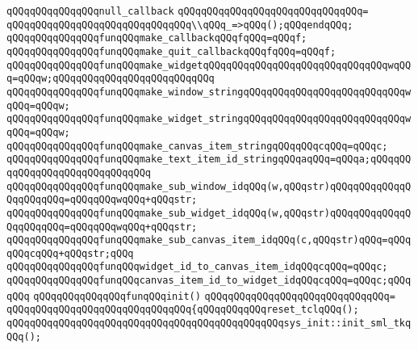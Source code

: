 \verb|qQQqqQQqqQQqqQQqnull_callback|\newline
\verb|qQQqqQQqqQQqqQQqqQQqqQQqqQQqqQQq=|\newline
\verb|qQQqqQQqqQQqqQQqqQQqqQQqqQQqqQQq\\qQQq_=>qQQq();qQQqendqQQq;|\newline
\newline
\verb|qQQqqQQqqQQqqQQqfunqQQqmake_callbackqQQqfqQQq=qQQqf;|\newline
\newline
\verb|qQQqqQQqqQQqqQQqfunqQQqmake_quit_callbackqQQqfqQQq=qQQqf;|\newline
\verb|qQQqqQQqqQQqqQQqfunqQQqmake_widgetqQQqqQQqqQQqqQQqqQQqqQQqqQQqqQQqwqQQq=qQQqw;qQQqqQQqqQQqqQQqqQQqqQQqqQQq|\newline
\newline
\verb|qQQqqQQqqQQqqQQqfunqQQqmake_window_stringqQQqqQQqqQQqqQQqqQQqqQQqqQQqwqQQq=qQQqw;|\newline
\verb|qQQqqQQqqQQqqQQqfunqQQqmake_widget_stringqQQqqQQqqQQqqQQqqQQqqQQqqQQqwqQQq=qQQqw;|\newline
\verb|qQQqqQQqqQQqqQQqfunqQQqmake_canvas_item_stringqQQqqQQqcqQQq=qQQqc;|\newline
\verb|qQQqqQQqqQQqqQQqfunqQQqmake_text_item_id_stringqQQqaqQQq=qQQqa;qQQqqQQqqQQqqQQqqQQqqQQqqQQqqQQq|\newline
\newline
\verb|qQQqqQQqqQQqqQQqfunqQQqmake_sub_window_idqQQq(w,qQQqstr)qQQqqQQqqQQqqQQqqQQqqQQq=qQQqqQQqwqQQq+qQQqstr;|\newline
\verb|qQQqqQQqqQQqqQQqfunqQQqmake_sub_widget_idqQQq(w,qQQqstr)qQQqqQQqqQQqqQQqqQQqqQQq=qQQqqQQqwqQQq+qQQqstr;|\newline
\verb|qQQqqQQqqQQqqQQqfunqQQqmake_sub_canvas_item_idqQQq(c,qQQqstr)qQQq=qQQqqQQqcqQQq+qQQqstr;qQQq|\newline
\newline
\verb|qQQqqQQqqQQqqQQqfunqQQqwidget_id_to_canvas_item_idqQQqcqQQq=qQQqc;|\newline
\verb|qQQqqQQqqQQqqQQqfunqQQqcanvas_item_id_to_widget_idqQQqcqQQq=qQQqc;qQQqqQQq|\newline
\newline
\verb|qQQqqQQqqQQqqQQqfunqQQqinit()|\newline
\verb|qQQqqQQqqQQqqQQqqQQqqQQqqQQqqQQq=|\newline
\verb|qQQqqQQqqQQqqQQqqQQqqQQqqQQqqQQq{qQQqqQQqqQQqreset_tclqQQq();|\newline
\verb|qQQqqQQqqQQqqQQqqQQqqQQqqQQqqQQqqQQqqQQqqQQqqQQqsys_init::init_sml_tkqQQq();|\newline
